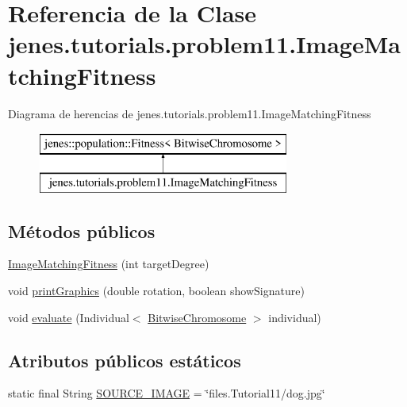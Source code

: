 \hypertarget{classjenes_1_1tutorials_1_1problem11_1_1_image_matching_fitness}{\section{Referencia de la Clase jenes.\-tutorials.\-problem11.\-Image\-Matching\-Fitness}
\label{classjenes_1_1tutorials_1_1problem11_1_1_image_matching_fitness}
}
Diagrama de herencias de jenes.\-tutorials.\-problem11.\-Image\-Matching\-Fitness\begin{figure}[H]
\begin{center}
\leavevmode
\includegraphics[height=2.000000cm]{classjenes_1_1tutorials_1_1problem11_1_1_image_matching_fitness}
\end{center}
\end{figure}
\subsection*{Métodos públicos}
\begin{DoxyCompactItemize}
\item 
\hyperlink{classjenes_1_1tutorials_1_1problem11_1_1_image_matching_fitness_ab2d23d7e2f9d4cbb57d5818dbcf91e05}{Image\-Matching\-Fitness} (int target\-Degree)
\item 
void \hyperlink{classjenes_1_1tutorials_1_1problem11_1_1_image_matching_fitness_a57d1723f3fea82e96455935aefb360b9}{print\-Graphics} (double rotation, boolean show\-Signature)
\item 
void \hyperlink{classjenes_1_1tutorials_1_1problem11_1_1_image_matching_fitness_ad1678b0716a862654451a29b12964ec1}{evaluate} (Individual$<$ \hyperlink{classjenes_1_1chromosome_1_1_bitwise_chromosome}{Bitwise\-Chromosome} $>$ individual)
\end{DoxyCompactItemize}
\subsection*{Atributos públicos estáticos}
\begin{DoxyCompactItemize}
\item 
static final String \hyperlink{classjenes_1_1tutorials_1_1problem11_1_1_image_matching_fitness_abcca6e100ede27ef9a90ddbc35497efd}{S\-O\-U\-R\-C\-E\-\_\-\-I\-M\-A\-G\-E} = \char`\"{}files.\-Tutorial11/dog.\-jpg\char`\"{}
\end{DoxyCompactItemize}
